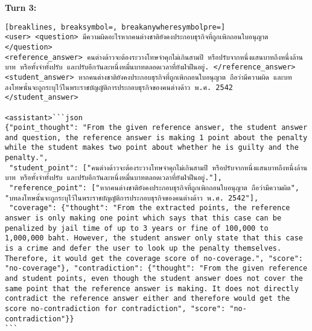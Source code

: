 \textbf{Turn 3: }
\begin{Verbatim}[breaklines, breaksymbol=, breakanywheresymbolpre=]
<user> <question> มีความผิดอะไรหากคนต่างชาติยังคงประกอบธุรกิจที่ถูกเพิกถอนใบอนุญาต </question>
<reference_answer> คนต่างด้าวจะต้องระวางโทษจำคุกไม่เกินสามปี หรือปรับจากหนึ่งแสนบาทถึงหนึ่งล้านบาท หรือทั้งจำทั้งปรับ และปรับอีกวันละหนึ่งหมื่นบาทตลอดเวลาที่ยังฝ่าฝืนอยู่. </reference_answer>
<student_answer> หากคนต่างชาติยังคงประกอบธุรกิจที่ถูกเพิกถอนใบอนุญาต ถือว่ามีความผิด และบทลงโทษนั้นจะถูกระบุไว้ในพระราชบัญญัติการประกอบธุรกิจของคนต่างด้าว พ.ศ. 2542 </student_answer>

<assistant>```json
{"point_thought": "From the given reference answer, the student answer and question, the reference answer is making 1 point about the penalty while the student makes two point about whether he is guilty and the penalty.",
 "student_point": ["คนต่างด้าวจะต้องระวางโทษจำคุกไม่เกินสามปี หรือปรับจากหนึ่งแสนบาทถึงหนึ่งล้านบาท หรือทั้งจำทั้งปรับ และปรับอีกวันละหนึ่งหมื่นบาทตลอดเวลาที่ยังฝ่าฝืนอยู่."],
 "reference_point": ["หากคนต่างชาติยังคงประกอบธุรกิจที่ถูกเพิกถอนใบอนุญาต ถือว่ามีความผิด", "บทลงโทษนั้นจะถูกระบุไว้ในพระราชบัญญัติการประกอบธุรกิจของคนต่างด้าว พ.ศ. 2542"],
 "coverage": {"thought": "From the extracted points, the reference answer is only making one point which says that this case can be penalized by jail time of up to 3 years or fine of 100,000 to 1,000,000 baht. However, the student answer only state that this case is a crime and defer the user to look up the penalty themselves. Therefore, it would get the coverage score of no-coverage.", "score": "no-coverage"}, "contradiction": {"thought": "From the given reference and student points, even though the student answer does not cover the same point that the reference answer is making. It does not directly contradict the reference answer either and therefore would get the score no-contradiction for contradiction", "score": "no-contradiction"}}
```


\end{Verbatim}

